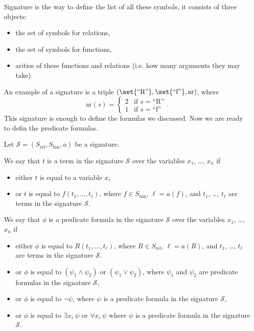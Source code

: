 Signature is the way to define the list of all these symbols, it consists of
three objects:
\begin{itemize}
  \item the set of symbols for relations,
  \item the set of symbols for functions,
  \item arities of these functions and relations (i.e. how many arguments they
    may take).
\end{itemize}
An example of a signature is a triple $(\set{\text{``R''}}, \set{\text{``f''}},
\mathrm{ar})$, where
\[
  \mathrm{ar}(s) = \begin{cases}
    2 & \text{if } s =  \text{``R''} \\
    1 & \text{if } s =  \text{``f''}
  \end{cases}.
\]
This signature is enough to define the formulas we discussed. Now we are ready
to defin the predicate formulas.

\begin{definition}
  Let $\mathcal{S} = (S_\mathrm{rel}, S_\mathrm{fun}, a)$ be a signature.

  We say that $t$ is a term in the signature $\mathcal{S}$ over the variables
  $x_1$, \dots, $x_n$ if
  \begin{itemize}
    \item either $t$ is equal to a variable $x_i$
    \item or $t$ is equal to $f(t_1, \dots, t_\ell)$, where
      $f \in S_\mathrm{fun}$, $\ell = a(f)$, and $t_1$, \dots, $t_\ell$
      are terms in the signature $\mathcal{S}$.
  \end{itemize}

  We say that $\phi$ is a predicate formula in the signature $\mathcal{S}$
  over the variables $x_1$, \dots, $x_n$  if
  \begin{itemize}
    \item either $\phi$ is equal to $R(t_1, \dots, t_\ell)$, where
      $R \in S_\mathrm{rel}$, $\ell = a(R)$, and $t_1$, \dots, $t_\ell$
      are terms in the signature $\mathcal{S}$.
    \item or $\phi$ is equal to $(\psi_1 \land \psi_2)$ or
      $(\psi_1 \lor \psi_2)$, where $\psi_1$ and $\psi_2$ are predicate
      formulas in the signature $\mathcal{S}$,
    \item or $\phi$ is equal to $\lnot \psi$, where $\psi$ is a predicate
      formula in the signature $\mathcal{S}$,
    \item or $\phi$ is equal to $\exists x_i~\psi$ or $\forall x_i~\psi$ where
      $\psi$ is a predicate formula in the signature $\mathcal{S}$.
  \end{itemize}
\end{definition}

